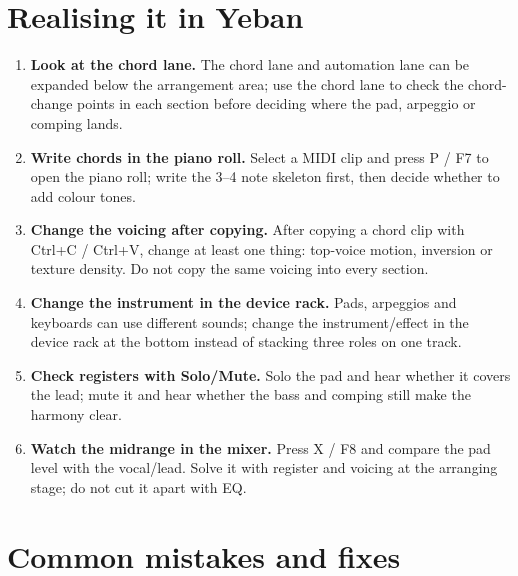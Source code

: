 \section{Realising it in Yeban}
\label{sec:harmony-yeban}

\begin{enumerate}
\item \textbf{Look at the chord lane.} The chord lane and automation lane can be expanded below the arrangement area; use the chord lane to check the chord-change points in each section before deciding where the pad, arpeggio or comping lands.
\item \textbf{Write chords in the piano roll.} Select a MIDI clip and press P / F7 to open the piano roll; write the 3--4 note skeleton first, then decide whether to add colour tones.
\item \textbf{Change the voicing after copying.} After copying a chord clip with Ctrl+C / Ctrl+V, change at least one thing: top-voice motion, inversion or texture density. Do not copy the same voicing into every section.
\item \textbf{Change the instrument in the device rack.} Pads, arpeggios and keyboards can use different sounds; change the instrument/effect in the device rack at the bottom instead of stacking three roles on one track.
\item \textbf{Check registers with Solo/Mute.} Solo the pad and hear whether it covers the lead; mute it and hear whether the bass and comping still make the harmony clear.
\item \textbf{Watch the midrange in the mixer.} Press X / F8 and compare the pad level with the vocal/lead. Solve it with register and voicing at the arranging stage; do not cut it apart with EQ.
\end{enumerate}


\section{Common mistakes and fixes}
\label{sec:harmony-mistakes}

